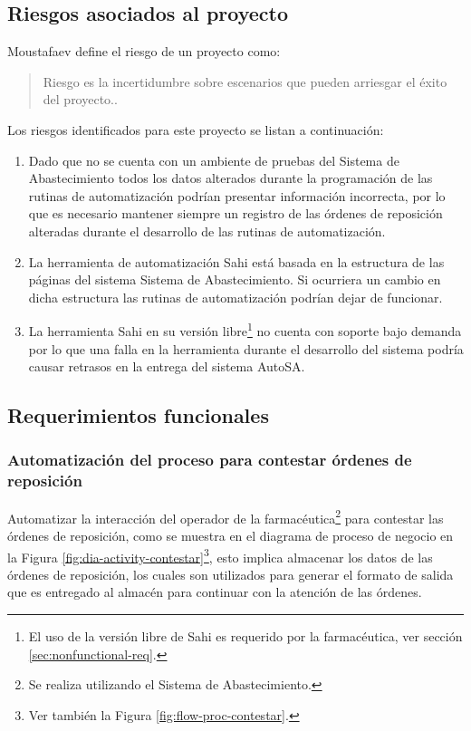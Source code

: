 \subsection{Riesgos asociados al proyecto}\label{sec-riesgos}
Moustafaev define el riesgo de un proyecto como:
\begin{quote}
Riesgo es la incertidumbre sobre escenarios que pueden arriesgar el éxito del proyecto.\cite{ScopeManagement}.
\end{quote}
Los riesgos identificados para este proyecto se listan a continuación:
\begin{enumerate}
  \item Dado que no se cuenta con un ambiente de pruebas del Sistema de Abastecimiento todos los datos alterados durante la programación de las rutinas de automatización podrían presentar información incorrecta, por lo que es necesario mantener siempre un registro de las órdenes de reposición alteradas durante el desarrollo de las rutinas de automatización.
  \item La herramienta de automatización Sahi está basada en la estructura de las páginas del sistema Sistema de Abastecimiento. Si ocurriera un cambio en dicha estructura las rutinas de automatización podrían dejar de funcionar.
  \item La herramienta Sahi en su versión libre\footnote{El uso de la versión libre de Sahi es requerido por la farmacéutica, ver sección \ref{sec:nonfunctional-req}.} no cuenta con soporte bajo demanda por lo que una falla en la herramienta durante el desarrollo del sistema podría causar retrasos en la entrega del sistema AutoSA.
\end{enumerate}


\subsection{Requerimientos funcionales}
\subsubsection{Automatización del proceso para contestar órdenes de reposición}
Automatizar la interacción del operador de la farmacéutica\footnote{Se realiza utilizando el Sistema de Abastecimiento.} para contestar las órdenes de reposición, como se muestra en el diagrama de proceso de negocio en la Figura \ref{fig:dia-activity-contestar}\footnote{Ver también la Figura \ref{fig:flow-proc-contestar}.}, esto implica almacenar los datos de las órdenes de reposición, los cuales son utilizados para generar el formato de salida que es entregado al almacén para continuar con la atención de las órdenes.

